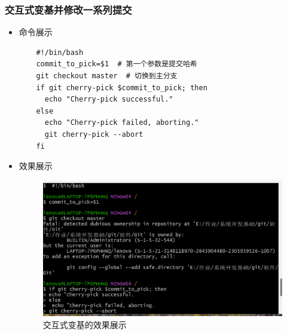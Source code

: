 \documentclass[UTF8]{ctexart}
\begin{document}
\subsubsection{交互式变基并修改一系列提交}
\begin{itemize}
  \item 命令展示
  \begin{verbatim}
    #!/bin/bash
    commit_to_pick=$1  # 第一个参数是提交哈希
    git checkout master  # 切换到主分支
    if git cherry-pick $commit_to_pick; then
      echo "Cherry-pick successful."
    else
      echo "Cherry-pick failed, aborting."
      git cherry-pick --abort
    fi
  \end{verbatim}

  \item 效果展示
  \begin{figure}[H]
    \centering
    \includegraphics[width=\textwidth]{14} %
    \caption{交互式变基的效果展示}
    \label{fig:interactive-rebase}
  \end{figure}
\end{itemize}
\end{document}
